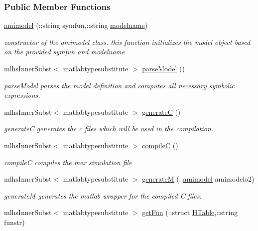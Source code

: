 \subsubsection*{Public Member Functions}
\begin{DoxyCompactItemize}
\item 
\hyperlink{classamimodel_a05d52506788717b3d482845748446a60}{amimodel} (\+::string symfun,\+::string \hyperlink{classamimodel_a71bca9c21a6de42d8079ade31cb61044}{modelname})
\begin{DoxyCompactList}\small\item\em constructor of the amimodel class. this function initializes the model object based on the provided symfun and modelname \end{DoxyCompactList}\item 
mlhs\+Inner\+Subst$<$ matlabtypesubstitute $>$ \hyperlink{classamimodel_a68efdc6ed5d618672bea1556209e5568}{parse\+Model} ()
\begin{DoxyCompactList}\small\item\em parse\+Model parses the model definition and computes all necessary symbolic expressions. \end{DoxyCompactList}\item 
mlhs\+Inner\+Subst$<$ matlabtypesubstitute $>$ \hyperlink{classamimodel_af2ce5001c2320c95471ecb8c3d73bdbb}{generate\+C} ()
\begin{DoxyCompactList}\small\item\em generate\+C generates the c files which will be used in the compilation. \end{DoxyCompactList}\item 
mlhs\+Inner\+Subst$<$ matlabtypesubstitute $>$ \hyperlink{classamimodel_ad1339463ebc3a2e6c6aeda6f63f1b4ed}{compile\+C} ()
\begin{DoxyCompactList}\small\item\em compile\+C compiles the mex simulation file \end{DoxyCompactList}\item 
mlhs\+Inner\+Subst$<$ matlabtypesubstitute $>$ \hyperlink{classamimodel_a1b75344ed773e2c5c1b76b8a97861234}{generate\+M} (\+::\hyperlink{classamimodel}{amimodel} amimodelo2)
\begin{DoxyCompactList}\small\item\em generate\+M generates the matlab wrapper for the compiled C files. \end{DoxyCompactList}\item 
mlhs\+Inner\+Subst$<$ matlabtypesubstitute $>$ \hyperlink{classamimodel_a73f1b1b08350475e8d854d1a7f1944e1}{get\+Fun} (\+::struct \hyperlink{classamimodel_aafe6335df413dd688a2f44efba012cf1}{H\+Table},\+::string funstr)

\end{DoxyCompactItemize}
